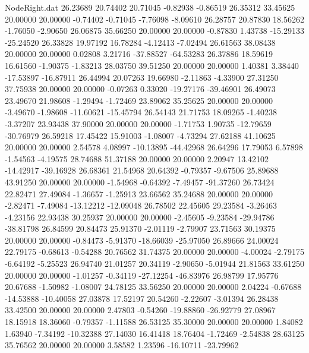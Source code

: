 \begin{filecontents}{NodeRight.dat}
  26.23689   20.74402   20.71045    -0.82938   -0.86519   26.35312   33.45625   20.00000   20.00000   -0.74402   -0.71045   -7.76098   -8.09610
  26.28757   20.87830   18.56262    -1.76050   -2.90650   26.06875   35.66250   20.00000   20.00000   -0.87830    1.43738  -15.29133  -25.24520
  26.33828   19.97192   16.78284    -4.12413   -7.02494   26.61563   38.08438   20.00000   20.00000    0.02808    3.21716  -37.88527  -64.53283
  26.37886   18.59619   16.61560    -1.90375   -1.83213   28.03750   39.51250   20.00000   20.00000    1.40381    3.38440  -17.53897  -16.87911
  26.44994   20.07263   19.66980    -2.11863   -4.33900   27.31250   37.75938   20.00000   20.00000   -0.07263    0.33020  -19.27176  -39.46901
  26.49073   23.49670   21.98608    -1.29494   -1.72469   23.89062   35.25625   20.00000   20.00000   -3.49670   -1.98608  -11.60621  -15.45794
  26.54143   21.71753   18.09265    -1.40238   -3.37207   23.93438   37.90000   20.00000   20.00000   -1.71753    1.90735  -12.79659  -30.76979
  26.59218   17.45422   15.91003    -1.08007   -4.73294   27.62188   41.10625   20.00000   20.00000    2.54578    4.08997  -10.13895  -44.42968
  26.64296   17.79053    6.57898    -1.54563   -4.19575   28.74688   51.37188   20.00000   20.00000    2.20947   13.42102  -14.42917  -39.16928
  26.68361   21.54968   20.64392    -0.79357   -9.67506   25.89688   43.91250   20.00000   20.00000   -1.54968   -0.64392   -7.49457  -91.37260
  26.73424   22.82471   27.49084    -1.36657   -1.25913   23.66562   35.24688   20.00000   20.00000   -2.82471   -7.49084  -13.12212  -12.09048
  26.78502   22.45605   29.23584    -3.26463   -4.23156   22.93438   30.25937   20.00000   20.00000   -2.45605   -9.23584  -29.94786  -38.81798
  26.84599   20.84473   25.91370    -2.01119   -2.79907   23.71563   30.19375   20.00000   20.00000   -0.84473   -5.91370  -18.66039  -25.97050
  26.89666   24.00024   22.79175    -0.68613   -0.54288   20.76562   31.74375   20.00000   20.00000   -4.00024   -2.79175   -6.64192   -5.25523
  26.94740   21.01257   20.34119    -2.90650   -5.01944   21.81563   33.61250   20.00000   20.00000   -1.01257   -0.34119  -27.12254  -46.83976
  26.98799   17.95776   20.67688    -1.50982   -1.08007   24.78125   33.56250   20.00000   20.00000    2.04224   -0.67688  -14.53888  -10.40058
  27.03878   17.52197   20.54260    -2.22607   -3.01394   26.28438   33.42500   20.00000   20.00000    2.47803   -0.54260  -19.88860  -26.92779
  27.08967   18.15918   18.36060    -0.79357   -1.11588   26.53125   35.30000   20.00000   20.00000    1.84082    1.63940   -7.34192  -10.32388
  27.14030   16.41418   18.76404    -1.72469   -2.54838   28.63125   35.76562   20.00000   20.00000    3.58582    1.23596  -16.10711  -23.79962

\end{filecontents}
